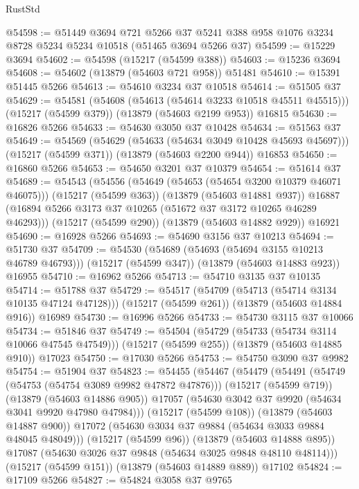\begin{lexlean}{RustStd}
\begin{coremodule}
@54598 := @51449
    @3694
    @721
    @5266
    @37
    @5241
    @388
    @958
    @1076
    @3234
    @8728
    @5234
    @5234
    @10518
    (@51465 @3694 @5266 @37)
@54599 := @15229 @3694
@54602 := @54598 (@15217 (@54599 @388))
@54603 := @15236 @3694
@54608 := @54602 (@13879 (@54603 @721 @958)) @51481
@54610 := @15391 @51445 @5266
@54613 := @54610 @3234 @37 @10518
@54614 := @51505 @37
@54629 := @54581
    (@54608 (@54613 (@54614 @3233 @10518 @45511 @45515)))
    (@15217 (@54599 @379))
    (@13879 (@54603 @2199 @953))
    @16815
@54630 := @16826 @5266
@54633 := @54630 @3050 @37 @10428
@54634 := @51563 @37
@54649 := @54569
    (@54629 (@54633 (@54634 @3049 @10428 @45693 @45697)))
    (@15217 (@54599 @371))
    (@13879 (@54603 @2200 @944))
    @16853
@54650 := @16860 @5266
@54653 := @54650 @3201 @37 @10379
@54654 := @51614 @37
@54689 := @54543
    (@54556
      (@54649 (@54653 (@54654 @3200 @10379 @46071 @46075)))
      (@15217 (@54599 @363))
      (@13879 (@54603 @14881 @937))
      @16887
      (@16894 @5266 @3173 @37 @10265 (@51672 @37 @3172 @10265 @46289 @46293)))
    (@15217 (@54599 @290))
    (@13879 (@54603 @14882 @929))
    @16921
@54690 := @16928 @5266
@54693 := @54690 @3156 @37 @10213
@54694 := @51730 @37
@54709 := @54530
    (@54689 (@54693 (@54694 @3155 @10213 @46789 @46793)))
    (@15217 (@54599 @347))
    (@13879 (@54603 @14883 @923))
    @16955
@54710 := @16962 @5266
@54713 := @54710 @3135 @37 @10135
@54714 := @51788 @37
@54729 := @54517
    (@54709 (@54713 (@54714 @3134 @10135 @47124 @47128)))
    (@15217 (@54599 @261))
    (@13879 (@54603 @14884 @916))
    @16989
@54730 := @16996 @5266
@54733 := @54730 @3115 @37 @10066
@54734 := @51846 @37
@54749 := @54504
    (@54729 (@54733 (@54734 @3114 @10066 @47545 @47549)))
    (@15217 (@54599 @255))
    (@13879 (@54603 @14885 @910))
    @17023
@54750 := @17030 @5266
@54753 := @54750 @3090 @37 @9982
@54754 := @51904 @37
@54823 := @54455
    (@54467
      (@54479
        (@54491
          (@54749 (@54753 (@54754 @3089 @9982 @47872 @47876)))
          (@15217 (@54599 @719))
          (@13879 (@54603 @14886 @905))
          @17057
          (@54630 @3042 @37 @9920 (@54634 @3041 @9920 @47980 @47984)))
        (@15217 (@54599 @108))
        (@13879 (@54603 @14887 @900))
        @17072
        (@54630 @3034 @37 @9884 (@54634 @3033 @9884 @48045 @48049)))
      (@15217 (@54599 @96))
      (@13879 (@54603 @14888 @895))
      @17087
      (@54630 @3026 @37 @9848 (@54634 @3025 @9848 @48110 @48114)))
    (@15217 (@54599 @151))
    (@13879 (@54603 @14889 @889))
    @17102
@54824 := @17109 @5266
@54827 := @54824 @3058 @37 @9765

\end{coremodule}
\end{lexlean}
